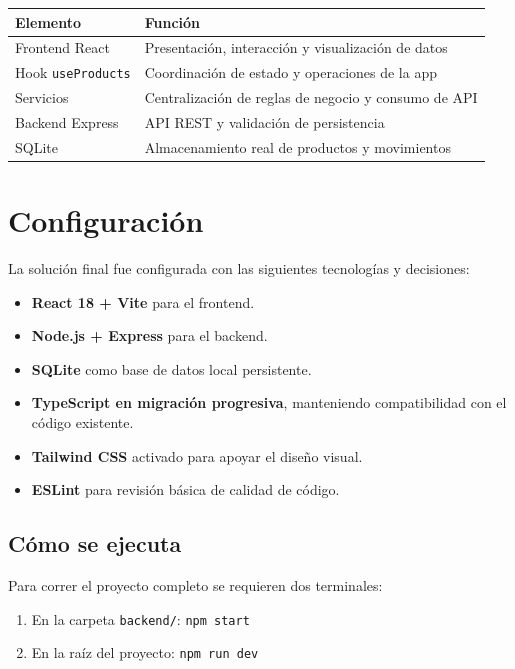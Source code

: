 \documentclass[12pt,a4paper]{article}
\begin{document}
\begin{longtable}{>{\raggedright\arraybackslash}p{4cm} >{\raggedright\arraybackslash}p{10cm}}
\toprule
\textbf{Elemento} & \textbf{Función} \\
\midrule
Frontend React & Presentación, interacción y visualización de datos \\
Hook \texttt{useProducts} & Coordinación de estado y operaciones de la app \\
Servicios & Centralización de reglas de negocio y consumo de API \\
Backend Express & API REST y validación de persistencia \\
SQLite & Almacenamiento real de productos y movimientos \\
\bottomrule
\end{longtable}

\section{Configuración}

La solución final fue configurada con las siguientes tecnologías y decisiones:

\begin{itemize}[leftmargin=1.2cm]
    \item \textbf{React 18 + Vite} para el frontend.
    \item \textbf{Node.js + Express} para el backend.
    \item \textbf{SQLite} como base de datos local persistente.
    \item \textbf{TypeScript en migración progresiva}, manteniendo compatibilidad con el código existente.
    \item \textbf{Tailwind CSS} activado para apoyar el diseño visual.
    \item \textbf{ESLint} para revisión básica de calidad de código.
\end{itemize}

\subsection{Cómo se ejecuta}

Para correr el proyecto completo se requieren dos terminales:

\begin{enumerate}[leftmargin=1.2cm]
    \item En la carpeta \texttt{backend/}: \texttt{npm start}
    \item En la raíz del proyecto: \texttt{npm run dev}
\end{enumerate}
\end{document}
